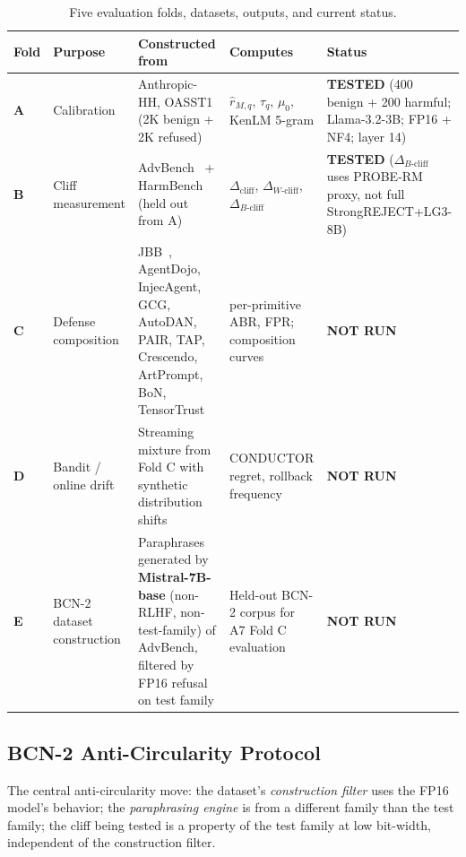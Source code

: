 \documentclass[11pt,a4paper]{article}
\newcommand{\cliff}{\Delta_{\mathrm{cliff}}}
\newcommand{\wcliff}{\Delta_{W\text{-cliff}}}
\newcommand{\bcliff}{\Delta_{B\text{-cliff}}}
\newcommand{\rhat}{\hat{r}}
\newcommand{\tauq}{\tau_q}
\begin{document}
\begin{table}[H]
  \centering
  \small
  \caption{Five evaluation folds, datasets, outputs, and current status.}
  \label{tab:folds}
  \begin{tabularx}{\textwidth}{@{}llp{4.0cm}p{3.0cm}X@{}}
    \toprule
    Fold & Purpose & Constructed from & Computes & \textbf{Status} \\
    \midrule
    \textbf{A} & Calibration & Anthropic-HH, OASST1 (2K benign + 2K refused) & $\rhat_{M,q}$, $\tauq$, $\mu_0$, KenLM 5-gram & \textcolor{green!50!black}{\textbf{TESTED}} (400 benign + 200 harmful; Llama-3.2-3B; FP16 + NF4; layer 14) \\[4pt]
    \textbf{B} & Cliff measurement & AdvBench~\citep{zou2023advbench} + HarmBench~\citep{mazeika2024harmbench} (held out from A) & $\cliff$, $\wcliff$, $\bcliff$ & \textcolor{green!50!black}{\textbf{TESTED}} ($\bcliff$ uses PROBE-RM proxy, not full StrongREJECT+LG3-8B) \\[4pt]
    \textbf{C} & Defense composition & JBB~\citep{chao2024jailbreakbench}, AgentDojo, InjecAgent, GCG, AutoDAN, PAIR, TAP, Crescendo, ArtPrompt, BoN, TensorTrust & per-primitive ABR, FPR; composition curves & \textcolor{red!60!black}{\textbf{NOT RUN}} \\[4pt]
    \textbf{D} & Bandit / online drift & Streaming mixture from Fold C with synthetic distribution shifts & CONDUCTOR regret, rollback frequency & \textcolor{red!60!black}{\textbf{NOT RUN}} \\[4pt]
    \textbf{E} & BCN-2 dataset construction & Paraphrases generated by \textbf{Mistral-7B-base} (non-RLHF, non-test-family) of AdvBench, filtered by FP16 refusal on test family & Held-out BCN-2 corpus for A7 Fold C evaluation & \textcolor{red!60!black}{\textbf{NOT RUN}} \\
    \bottomrule
  \end{tabularx}
\end{table}

\subsection{BCN-2 Anti-Circularity Protocol}

The central anti-circularity move: the dataset's \emph{construction filter} uses the
FP16 model's behavior; the \emph{paraphrasing engine} is from a different family
than the test family; the cliff being tested is a property of the test family at
low bit-width, independent of the construction filter.
\end{document}
